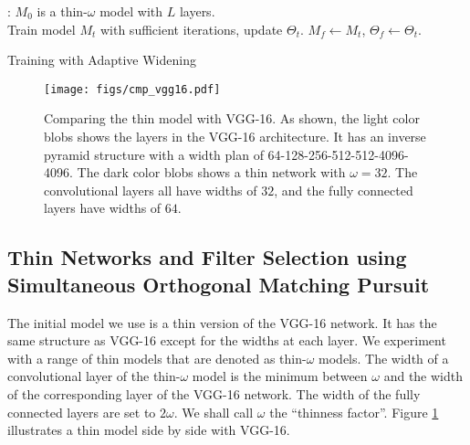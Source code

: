 \documentclass[10pt,twocolumn,letterpaper]{article}
\begin{document}
\begin{algorithm}[!t]\label{alg:outline} \small
	\SetInd{1ex}{1ex}
	: $M_0$ is a thin-$\omega$ model with $L$ layers. \\ 
Train model $M_t$ with sufficient iterations, update $\Theta_t$. 
$M_f \leftarrow M_t$, $\Theta_f \leftarrow \Theta_t$.  
\caption{Training with Adaptive Widening}
\end{algorithm}

\begin{figure}[t]
	\begin{center}
		\texttt{[image: figs/cmp\_vgg16.pdf]}  
	\end{center}
	\caption{Comparing the thin model with VGG-16. As shown, the light color blobs shows the layers in the VGG-16 architecture. It has an inverse pyramid structure with a width plan of 64-128-256-512-512-4096-4096. The dark color blobs shows a thin network with $\omega=32$. The convolutional layers all have widths of $32$, and the fully connected layers have widths of $64$.}
	\label{fig:cmp_vgg16}
	\vspace{-2mm}
\end{figure}

\subsection{Thin Networks and Filter Selection using Simultaneous Orthogonal Matching Pursuit}
\label{sec:somp}
The initial model we use is a thin version of the VGG-16 network. It has the same structure as VGG-16 except for the widths at each layer. We experiment with a range of thin models that are denoted as thin-$\omega$ models. The width of a convolutional layer of the thin-$\omega$ model is the minimum between $\omega$ and the width of the corresponding layer of the VGG-16 network. The width of the fully connected layers are set to $2\omega$. We shall call $\omega$ the ``thinness factor''. Figure \ref{fig:cmp_vgg16} illustrates a thin model side by side with VGG-16. 
\end{document}
